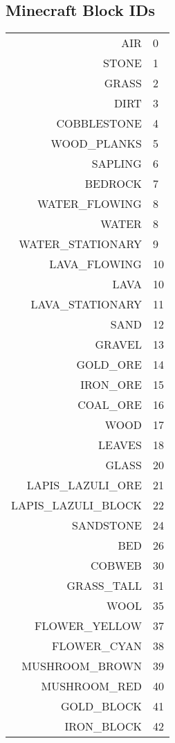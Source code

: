 	\begin{appendices}
		
		\section{Minecraft Block IDs} \label{sec:blockids}
			
			\scriptsize
			\begin{tabular}{rl}
				AIR & 0 \\
				STONE & 1 \\
				GRASS & 2 \\
				DIRT & 3 \\
				COBBLESTONE & 4 \\
				WOOD\_PLANKS & 5 \\
				SAPLING & 6 \\
				BEDROCK & 7 \\
				WATER\_FLOWING & 8 \\
				WATER & 8 \\
				WATER\_STATIONARY & 9 \\
				LAVA\_FLOWING & 10 \\
				LAVA & 10 \\
				LAVA\_STATIONARY & 11 \\
				SAND & 12 \\
				GRAVEL & 13 \\
				GOLD\_ORE & 14 \\
				IRON\_ORE & 15 \\
				COAL\_ORE & 16 \\
				WOOD & 17 \\
				LEAVES & 18 \\
				GLASS & 20 \\
				LAPIS\_LAZULI\_ORE & 21 \\
				LAPIS\_LAZULI\_BLOCK & 22 \\
				SANDSTONE & 24 \\
				BED & 26 \\
				COBWEB & 30 \\
				GRASS\_TALL & 31 \\
				WOOL & 35 \\
				FLOWER\_YELLOW & 37 \\
				FLOWER\_CYAN & 38 \\
				MUSHROOM\_BROWN & 39 \\
				MUSHROOM\_RED & 40 \\
				GOLD\_BLOCK & 41 \\
				IRON\_BLOCK & 42 \\

\end{tabular}
\end{appendices}
